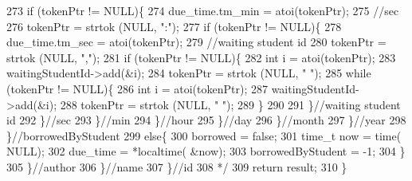\begin{DoxyCode}
273 \textcolor{comment}{                                        if (tokenPtr != NULL)\{}
274 \textcolor{comment}{                                            due\_time.tm\_min = atoi(tokenPtr);}
275 \textcolor{comment}{                                            //sec}
276 \textcolor{comment}{                                            tokenPtr = strtok (NULL, ":");}
277 \textcolor{comment}{                                            if (tokenPtr != NULL)\{}
278 \textcolor{comment}{                                                due\_time.tm\_sec = atoi(tokenPtr);}
279 \textcolor{comment}{                                                //waiting student id}
280 \textcolor{comment}{                                                tokenPtr = strtok (NULL, ",");}
281 \textcolor{comment}{                                                if (tokenPtr != NULL)\{}
282 \textcolor{comment}{                                                    int i = atoi(tokenPtr);}
283 \textcolor{comment}{                                                    waitingStudentId->add(&i);}
284 \textcolor{comment}{                                                    tokenPtr = strtok (NULL, " ");}
285 \textcolor{comment}{                                                    while (tokenPtr != NULL)\{}
286 \textcolor{comment}{                                                        int i = atoi(tokenPtr);}
287 \textcolor{comment}{                                                        waitingStudentId->add(&i);}
288 \textcolor{comment}{                                                        tokenPtr = strtok (NULL, " ");}
289 \textcolor{comment}{                                                    \}}
290 \textcolor{comment}{}
291 \textcolor{comment}{                                                \}//waiting student id}
292 \textcolor{comment}{                                            \}//sec}
293 \textcolor{comment}{                                        \}//min}
294 \textcolor{comment}{                                    \}//hour}
295 \textcolor{comment}{                                \}//day}
296 \textcolor{comment}{                            \}//month}
297 \textcolor{comment}{                        \}//year}
298 \textcolor{comment}{                    \}//borrowedByStudent}
299 \textcolor{comment}{                    else\{}
300 \textcolor{comment}{                        borrowed = false;}
301 \textcolor{comment}{                        time\_t now = time( NULL);}
302 \textcolor{comment}{                        due\_time = *localtime( &now);}
303 \textcolor{comment}{                        borrowedByStudent = -1;}
304 \textcolor{comment}{                    \}}
305 \textcolor{comment}{            \}//author}
306 \textcolor{comment}{        \}//name}
307 \textcolor{comment}{    \}//id}
308 \textcolor{comment}{    */}
309     \textcolor{keywordflow}{return} result;
310 \}
\end{DoxyCode}
